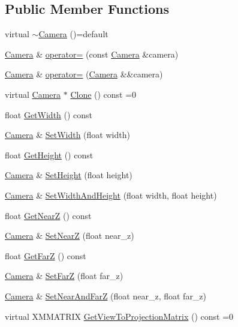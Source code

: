 \subsection*{Public Member Functions}
\begin{DoxyCompactItemize}
\item 
virtual \hyperlink{classmage_1_1_camera_a181f7fdf168c0d66022edfecb697dd7d}{$\sim$\+Camera} ()=default
\item 
\hyperlink{classmage_1_1_camera}{Camera} \& \hyperlink{classmage_1_1_camera_ae16a5f66b80f7fa771475aa1eb099634}{operator=} (const \hyperlink{classmage_1_1_camera}{Camera} \&camera)
\item 
\hyperlink{classmage_1_1_camera}{Camera} \& \hyperlink{classmage_1_1_camera_aab826877e458127dadfb7ed54f9336a9}{operator=} (\hyperlink{classmage_1_1_camera}{Camera} \&\&camera)
\item 
virtual \hyperlink{classmage_1_1_camera}{Camera} $\ast$ \hyperlink{classmage_1_1_camera_a19301c2256c183db50b5e9406f7b5f3c}{Clone} () const =0
\item 
float \hyperlink{classmage_1_1_camera_a2285655605035118861297b2449a3443}{Get\+Width} () const
\item 
\hyperlink{classmage_1_1_camera}{Camera} \& \hyperlink{classmage_1_1_camera_acddfb1108ee8f7e937833286c082dadf}{Set\+Width} (float width)
\item 
float \hyperlink{classmage_1_1_camera_a4c6c5e96085651ce29cd6e87543d21ec}{Get\+Height} () const
\item 
\hyperlink{classmage_1_1_camera}{Camera} \& \hyperlink{classmage_1_1_camera_a83ab1d3345b3fc318608c016b6b523d9}{Set\+Height} (float height)
\item 
\hyperlink{classmage_1_1_camera}{Camera} \& \hyperlink{classmage_1_1_camera_a275b6908662c0cde4fec5485ff04a846}{Set\+Width\+And\+Height} (float width, float height)
\item 
float \hyperlink{classmage_1_1_camera_a175e3c36526a8a3e28cd2f8bd1701c55}{Get\+NearZ} () const
\item 
\hyperlink{classmage_1_1_camera}{Camera} \& \hyperlink{classmage_1_1_camera_ae2e148f1ff5128442927abc87114a739}{Set\+NearZ} (float near\+\_\+z)
\item 
float \hyperlink{classmage_1_1_camera_a7f293a8711086b3419fe3b4224ff2778}{Get\+FarZ} () const
\item 
\hyperlink{classmage_1_1_camera}{Camera} \& \hyperlink{classmage_1_1_camera_acd1ab15368f052b846f72b92a52a94c5}{Set\+FarZ} (float far\+\_\+z)
\item 
\hyperlink{classmage_1_1_camera}{Camera} \& \hyperlink{classmage_1_1_camera_a8cb00dc1b8455197412c80f321011dc1}{Set\+Near\+And\+FarZ} (float near\+\_\+z, float far\+\_\+z)
\item 
virtual X\+M\+M\+A\+T\+R\+IX \hyperlink{classmage_1_1_camera_a1f5206864cf18b5548219492556df5d2}{Get\+View\+To\+Projection\+Matrix} () const =0
\end{DoxyCompactItemize}

